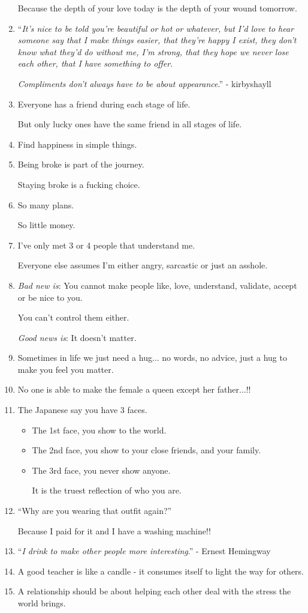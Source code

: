 \documentclass{article}
\begin{document}
\begin{enumerate}
	Because the depth of your love today is the depth of your wound tomorrow.
	\item ``\textit{It's nice to be told you're beautiful or hot or whatever, but I'd love to hear someone say that I make things easier, that they're happy I exist, they don't know what they'd do without me, I'm strong, that they hope we never lose each other, that I have something to offer}.
	
	\textit{Compliments don't always have to be about appearance}.'' - kirbyshayll
	\item Everyone has a friend during each stage of life.
	
	But only lucky ones have the same friend in all stages of life.
	\item Find happiness in simple things.
	\item Being broke is part of the journey.
	
	Staying broke is a fucking choice.
	\item So many plans.
	
	So little money.
	\item I've only met 3 or 4 people that understand me.
	
	Everyone else assumes I'm either angry, sarcastic or just an asshole.
	\item \textit{Bad new is}: You cannot make people like, love, understand, validate, accept or be nice to you.
	
	You can't control them either.
	
	\textit{Good news is}: It doesn't matter.
	\item Sometimes in life we just need a hug$\ldots$ no words, no advice, just a hug to make you feel you matter.
	\item No one is able to make the female a queen except her father$\ldots$!!
	\item The Japanese say you have 3 faces.
	\begin{itemize}
		\item The 1st face, you show to the world.
		\item The 2nd face, you show to your close friends, and your family.
		\item The 3rd face, you never show anyone.
		
		It is the truest reflection of who you are.
	\end{itemize}
	\item ``Why are you wearing that outfit again?''
	
	Because I paid for it and I have a washing machine!!
	\item ``\textit{I drink to make other people more interesting}.'' - Ernest Hemingway
	\item A good teacher is like a candle - it consumes itself to light the way for others.
	\item A relationship should be about helping each other deal with the stress the world brings.
	

\end{enumerate}
\end{document}
